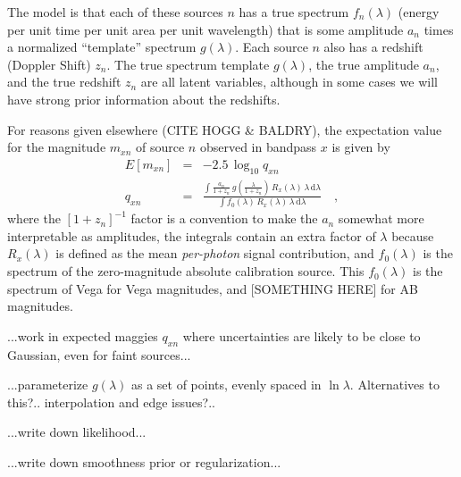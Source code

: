 \documentclass[12pt,preprint,letterpaper]{aastex}
\newcommand{\dd}{\mathrm{d}}
\begin{document}
The model is that each of these sources $n$ has a true spectrum $f_n(\lambda)$ (energy per unit time per unit area per unit wavelength)
  that is some amplitude $a_n$ times a normalized ``template'' spectrum $g(\lambda)$.
Each source $n$ also has a redshift (Doppler Shift) $z_n$.
The true spectrum template $g(\lambda)$, the true amplitude $a_n$, and the true redshift $z_n$ are all latent variables,
  although in some cases we will have strong prior information about the redshifts.

For reasons given elsewhere (CITE HOGG \& BALDRY), the expectation value for the magnitude $m_{xn}$
  of source $n$ observed in bandpass $x$ is given by
\begin{eqnarray}
E[m_{xn}] &=&
  -2.5\,\log_{10} q_{xn}
\\
q_{xn} &=&
  \frac{\displaystyle\int\frac{a_n}{1+z_n}\,g(\frac{\lambda}{1+z_n})\,R_x(\lambda)\,\lambda\,\dd\lambda}%
       {\displaystyle\int f_0(\lambda)\,R_x(\lambda)\,\lambda\,\dd\lambda}%
\quad ,
\end{eqnarray}
where the $[1+z_n]^{-1}$ factor is a convention to make the $a_n$ somewhat more interpretable as amplitudes,
  the integrals contain an extra factor of $\lambda$ because $R_x(\lambda)$ is defined as the mean \emph{per-photon} signal contribution,
  and $f_0(\lambda)$ is the spectrum of the zero-magnitude absolute calibration source.
This $f_0(\lambda)$ is the spectrum of Vega for Vega magnitudes,
  and [SOMETHING HERE] for AB magnitudes.

...work in expected maggies $q_{xn}$ where uncertainties are likely to be close to Gaussian, even for faint sources...

...parameterize $g(\lambda)$ as a set of points, evenly spaced in $\ln\lambda$.  Alternatives to this?.. interpolation and edge issues?..

...write down likelihood...

...write down smoothness prior or regularization...
\end{document}
